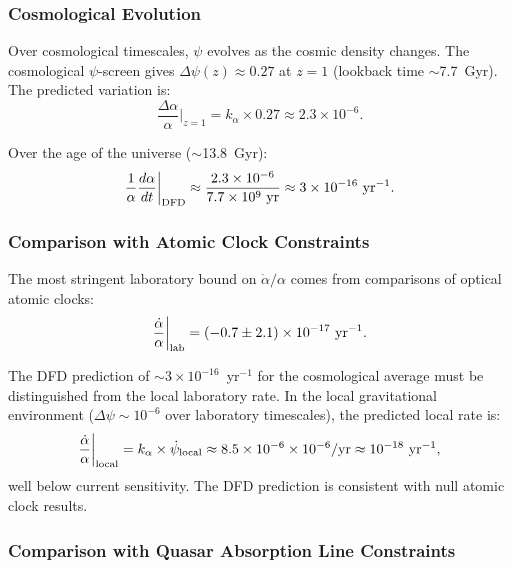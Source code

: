 \documentclass[aps,prd,twocolumn,superscriptaddress,nofootinbib]{revtex4-2}
\begin{document}
\subsubsection{Cosmological Evolution}

Over cosmological timescales, $\psi$ evolves as the cosmic
density changes. The cosmological $\psi$-screen gives
$\Delta\psi(z) \approx 0.27$ at $z = 1$ (lookback time
$\sim$7.7~Gyr). The predicted variation is:
\begin{equation}
\frac{\Delta\alpha}{\alpha}\bigg|_{z=1} = k_\alpha\times 0.27
\approx 2.3\times 10^{-6}.
\end{equation}

Over the age of the universe ($\sim$13.8~Gyr):
\begin{equation}\label{eq:dalpha-pred}
\frac{1}{\alpha}\frac{d\alpha}{dt}\bigg|_{\rm DFD}
\approx \frac{2.3\times10^{-6}}{7.7\times10^9~\text{yr}}
\approx 3\times 10^{-16}~\text{yr}^{-1}.
\end{equation}

\subsubsection{Comparison with Atomic Clock Constraints}

The most stringent laboratory bound on $\dot\alpha/\alpha$ comes
from comparisons of optical atomic clocks:
\begin{equation}
\frac{\dot\alpha}{\alpha}\bigg|_{\rm lab}
= (-0.7 \pm 2.1)\times 10^{-17}~\text{yr}^{-1}.
\end{equation}

The DFD prediction of $\sim 3\times 10^{-16}$~yr$^{-1}$ for the
cosmological average must be distinguished from the local
laboratory rate. In the local gravitational environment
($\Delta\psi \sim 10^{-6}$ over laboratory timescales), the
predicted local rate is:
\begin{equation}
\frac{\dot\alpha}{\alpha}\bigg|_{\rm local}
= k_\alpha\times\dot\psi_{\rm local}
\approx 8.5\times10^{-6}\times 10^{-6}/\text{yr}
\approx 10^{-18}~\text{yr}^{-1},
\end{equation}
well below current sensitivity. The DFD prediction is
consistent with null atomic clock results.

\subsubsection{Comparison with Quasar Absorption Line Constraints}
\end{document}

